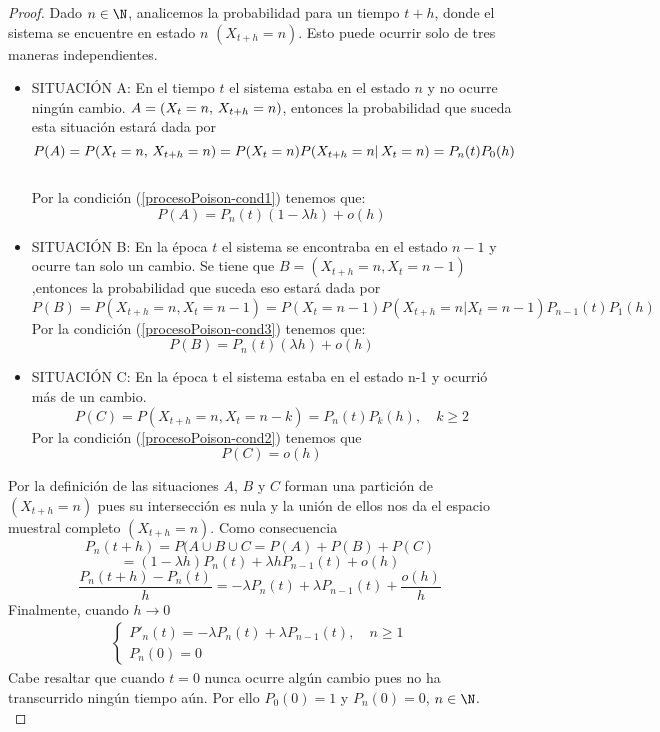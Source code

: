     \begin{proof}
        Dado $n\in\N$, analicemos la probabilidad para un tiempo $t+h$, donde el sistema se encuentre en estado $n$ $(X_{t+h}=n)$. Esto puede ocurrir solo de tres maneras independientes.
        \begin{itemize}
            \item SITUACIÓN A: En el tiempo $t$ el sistema estaba en el estado $n$ y no ocurre ningún cambio. $A=(X_t=n,\thinspace X_{t+h}=n)$, entonces la probabilidad que suceda esta situación estará dada por $$P(A)=P(X_t=n,\thinspace X_{t+h}=n)=P(X_t=n)P(X_{t+h}=n|\thinspace X_{t}=n)=P_n(t)P_0(h)$$\\
            Por la condición (\ref{procesoPoison-cond1})
            tenemos que:
            $$P(A)=P_n(t)(1-\lambda h)+o(h)$$
            \item SITUACIÓN B: En la época $t$ el sistema se encontraba en el estado $n-1$ y ocurre tan solo un cambio. Se tiene que $B=(X_{t+h}=n, X_t=n-1)$ ,entonces la  probabilidad que suceda eso estará dada por
            $$P(B)=P(X_{t+h}=n, X_t=n-1)=P(X_t=n-1)P(X_{t+h}=n|X_t=n-1)P_{n-1}(t)P_1(h)$$
             Por la condición (\ref{procesoPoison-cond3})
            tenemos que:
            $$P(B)=P_n(t)(\lambda h)+o(h)$$
            \item SITUACIÓN C: En la época t el sistema estaba en el estado n-1 y ocurrió más de un cambio.
            $$P(C)=P(X_{t+h}=n, X_t=n-k)=P_n(t)P_k(h), \quad k\geq 2$$
             Por la condición (\ref{procesoPoison-cond2})
            tenemos que
            $$P(C)=o(h)$$
        \end{itemize}
        Por la definición de las situaciones $A$, $B$ y $C$ forman una partición de $(X_{t+h}=n)$ pues su intersección es nula y la unión de ellos nos da el espacio muestral completo $(X_{t+h}=n)$. Como consecuencia 
        $$P_n(t+h)=P(A\cup B\cup C=P(A)+P(B)+P(C)$$ $$=(1-\lambda h)P_n(t)+\lambda h P_{n-1}(t)+o(h)$$
        $$\frac{P_n(t+h)-P_n(t)}{h}=-\lambda P_n(t)+\lambda P_{n-1}(t)+\frac{o(h)}{h}$$
        Finalmente, cuando $h\rightarrow 0$
        \begin{eqnarray}
            \begin{cases}
                P'_n(t)=-\lambda P_n(t)+\lambda P_{n-1}(t),\quad n\geq 1\\
                P_n(0)=0
            \end{cases}
            \label{ProcPoison-edo-n}
        \end{eqnarray}
        Cabe resaltar que cuando $t=0$ nunca ocurre algún cambio pues no ha transcurrido ningún tiempo aún. Por ello $P_0(0)=1$ y $P_n(0)=0$, $n\in\N$. \\

\end{proof}
